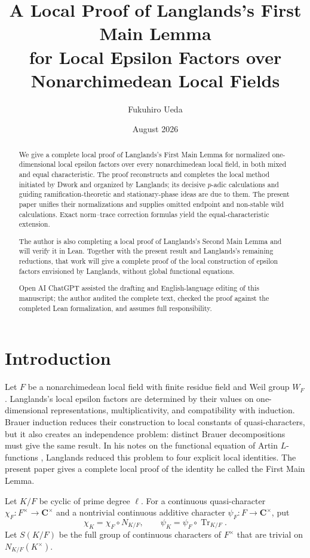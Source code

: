 \documentclass[11pt]{amsart}
\title[The First Main Lemma for Local Epsilon Factors]
{A Local Proof of Langlands's First Main Lemma\\
for Local Epsilon Factors over Nonarchimedean Local Fields}
\author{Fukuhiro Ueda}
\date{August 2026}
\theoremstyle{definition}
\theoremstyle{remark}
\newcommand{\C}{\mathbf C}
\newcommand{\Tr}{\operatorname{Tr}}
\begin{document}
\begin{abstract}
We give a complete local proof of Langlands's First Main Lemma for
normalized one-dimensional local epsilon factors over every
nonarchimedean local field, in both mixed and equal characteristic.  The
proof reconstructs and completes the local method initiated by Dwork and
organized by Langlands; its decisive $p$-adic calculations and guiding
ramification-theoretic and stationary-phase ideas are due to them.  The
present paper unifies their normalizations and supplies omitted endpoint and
non-stable wild calculations. Exact norm--trace correction formulas yield the equal-characteristic
extension.  

The author is also completing a local
proof of Langlands's Second Main Lemma and will verify it in Lean.
Together with the present result and Langlands's remaining reductions,
that work will give a complete proof of the local construction of
epsilon factors envisioned by Langlands, without global functional
equations.  

Open AI ChatGPT assisted the drafting and English-language editing of this manuscript;
the author audited the complete text, checked the proof against the
completed Lean formalization, and assumes full responsibility.
\end{abstract}
\maketitle

\clearpage
\tableofcontents
\clearpage

\section{Introduction}\label{sec:introduction}

Let $F$ be a nonarchimedean local field with finite residue field and
Weil group $W_F$.  Langlands's local epsilon factors are determined by
their values on one-dimensional representations, multiplicativity, and
compatibility with induction.  Brauer induction reduces their
construction to local constants of quasi-characters, but it also creates
an independence problem: distinct Brauer decompositions must give the
same result.  In his notes on the functional equation of Artin
$L$-functions \cite{Langlands}, Langlands reduced this problem to four
explicit local identities.  The present paper gives a complete local
proof of the identity he called the First Main Lemma.

Let $K/F$ be cyclic of prime degree $\ell$.  For a continuous
quasi-character $\chi_F:F^\times\to\C^\times$ and a nontrivial
continuous additive character $\psi_F:F\to\C^\times$, put
\[
 \chi_K=\chi_F\circ N_{K/F},
 \qquad
 \psi_K=\psi_F\circ\Tr_{K/F}.
\]
Let $S(K/F)$ be the full group of continuous characters of $F^\times$
that are trivial on $N_{K/F}(K^\times)$. 
\end{document}
